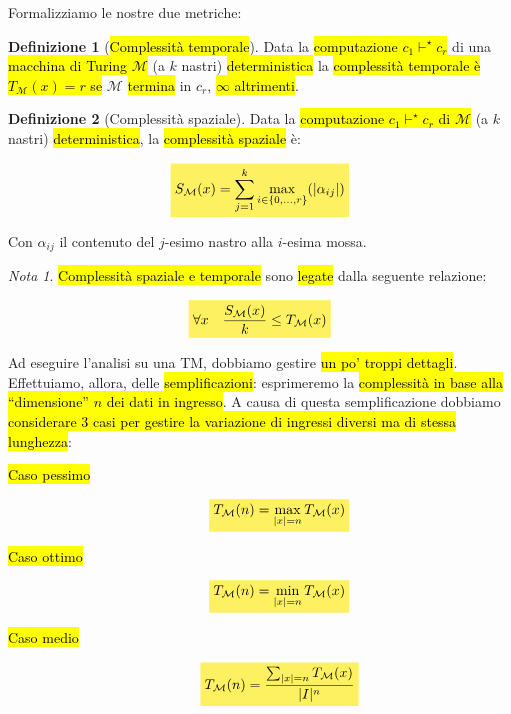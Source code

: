 \documentclass[a4paper,11pt,twoside]{article}
\theoremstyle{plain}
\theoremstyle{definition}
\newtheorem{defn}{Definizione}[section]
\theoremstyle{remark}
\newtheorem*{nota}{Nota}
\newcommand{\mhl}[1]{\colorbox{hlcolor}{$\displaystyle #1$}}
\begin{document}
Formalizziamo le nostre due metriche:

\begin{defn}[\hl{Complessità temporale}]\label{def:comp-temporale}
  Data la \hl{computazione $c_1 \vdash^\star c_r$} di una \hl{macchina di Turing
  $\mathcal{M}$} (a $k$ nastri) \hl{deterministica} la \hl{complessità temporale
  è $T_\mathcal{M}(x) = r$ se} $\mathcal{M}$ \hl{termina} in $c_r$, \hl{$\infty$
  altrimenti}.
\end{defn}

\begin{defn}[Complessità spaziale]\label{def:comp-spaziale}
  Data la \hl{computazione $c_1 \vdash^\star c_r$ di $\mathcal{M}$} (a $k$ nastri)
  \hl{deterministica}, la \hl{complessità spaziale} è:

  \begin{equation}
    \mhl{
      S_\mathcal{M}(x) = \sum_{j=1}^{k} \max_{i \in \{0, \ldots, r\}}(|\alpha_{ij}|)
    }
  \end{equation}

  Con $\alpha_{ij}$ il contenuto del $j$-esimo nastro alla $i$-esima mossa.
\end{defn}

\begin{nota}
  \hl{Complessità spaziale e temporale} sono \hl{legate} dalla seguente
  relazione:

  \begin{equation}
    \mhl{
      \forall x \quad \frac{S_\mathcal{M}(x)}{k} \leq T_\mathcal{M}(x)
    }
  \end{equation}
\end{nota}

Ad eseguire l'analisi su una TM, dobbiamo gestire \hl{un po' troppi dettagli}.
Effettuiamo, allora, delle \hl{semplificazioni}: esprimeremo la \hl{complessità
in base alla ``dimensione'' $n$ dei dati in ingresso}. A causa di questa
semplificazione dobbiamo \hl{considerare 3 casi per gestire la variazione di
ingressi diversi ma di stessa lunghezza}:

\begin{description}
  \item[\hl{Caso pessimo}]
    \begin{equation}
      \mhl{
        T_\mathcal{M}(n) = \max_{|x|=n} T_\mathcal{M}(x)\label{def:caso-pessimo}
      }
    \end{equation}

  \item[\hl{Caso ottimo}]
    \begin{equation}
      \mhl{
        T_\mathcal{M}(n) = \min_{|x|=n} T_\mathcal{M}(x)\label{def:caso-ottimo}
      }
    \end{equation}

  \item[\hl{Caso medio}]
    \begin{equation}
      \mhl{
        T_\mathcal{M}(n) = \frac{\sum_{|x|=n} T_\mathcal{M}(x)}{|I|^n}\label{def:caso-medio}
      }
    \end{equation}
\end{description}
\end{document}
